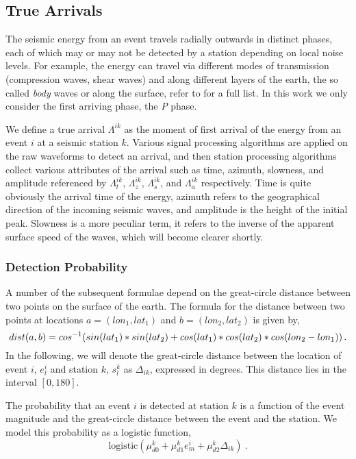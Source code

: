 \documentclass[12pt,letterpaper,onecolumn,oneside]{article}
\begin{document}
\subsection{True Arrivals}

The seismic energy from an event travels radially outwards in distinct
phases, each of which may or may not be detected by a station depending
on local noise levels. For example, the energy can travel via different
modes of transmission (compression waves, shear waves) and along
different layers of the earth, the so called {\em body} waves or along
the surface, refer to \citet{iaspei2011} for a full list. In this work we only
consider the first arriving phase, the {\em P} phase.

We define a true arrival $\Lambda^{ik}$ as the moment of first arrival
of the energy from an event $i$ at a seismic station $k$. Various signal
processing algorithms are applied on the raw waveforms to detect an
arrival, and then station processing algorithms collect various
attributes of the
arrival such as time, azimuth, slowness, and amplitude referenced by
$\Lambda^{ik}_t$, $\Lambda^{ik}_z$, $\Lambda^{ik}_s$, and
$\Lambda^{ik}_a$ respectively. Time is quite obviously the arrival time
of the energy, azimuth refers to the geographical direction of the
incoming seismic waves, and amplitude is the height of the initial
peak. Slowness is a more peculiar term, it refers to the inverse of the
apparent surface speed of the waves, which will become clearer shortly.

\subsubsection{Detection Probability}

A number of the subsequent formulae depend on the great-circle distance
between two points on the surface of the earth. The formula for the
distance between two points at locations $a=(lon_1, lat_1)$ and 
$b=(lon_2, lat_2)$ is given by,
\[
dist(a,b) \\
= cos^{-1} ( sin(lat_1) * sin(lat_2) + cos(lat_1) * cos(lat_2) *
cos(lon_2 - lon_1) ) \, .
\]
In the following, we will denote the great-circle distance between the
location of event $i$, $e^i_l$ and station $k$, $s^k_l$ as
$\Delta_{ik}$, expressed in degrees. This distance lies in the interval
$[0,180]$.

The probability that an event $i$ is detected at station $k$ is a
function of the event magnitude and the great-circle distance between
the event and the station. We model this probability as a logistic
function,
\[\text{logistic}
(\mu_{d0}^k + \mu_{d1}^k e^i_m + \mu_{d2}^k \Delta_{ik}) \ .\]
\end{document}
